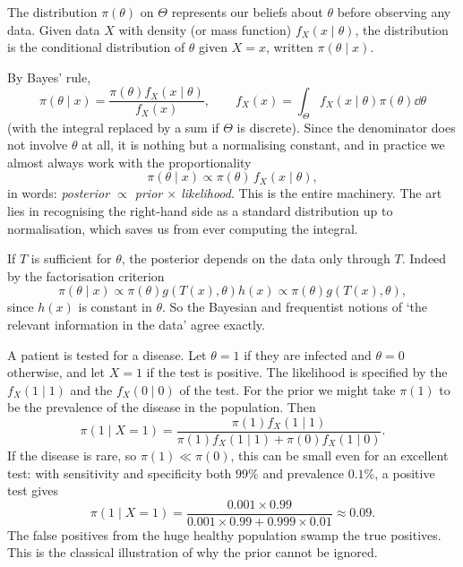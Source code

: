 \documentclass[a4paper]{scrartcl}
\begin{document}
\begin{definition}
  The  distribution $\pi(\theta)$ on $\Theta$ represents our beliefs about $\theta$ before observing any data. Given data $X$ with density (or mass function) $f_X(x \mid \theta)$, the  distribution is the conditional distribution of $\theta$ given $X = x$, written $\pi(\theta \mid x)$.
\end{definition}

By Bayes' rule,
$$
\pi(\theta \mid x) = \frac{\pi(\theta) f_X(x\mid\theta)}{f_X(x)}, \qquad f_X(x) = \int_\Theta f_X(x\mid\theta)\pi(\theta)\dd\theta
$$
(with the integral replaced by a sum if $\Theta$ is discrete). Since the denominator does not involve $\theta$ at all, it is nothing but a normalising constant, and in practice we almost always work with the proportionality
$$
\pi(\theta\mid x) \propto \pi(\theta)\, f_X(x\mid\theta),
$$
in words: \emph{posterior $\propto$ prior $\times$ likelihood}. This is the entire machinery. The art lies in recognising the right-hand side as a standard distribution up to normalisation, which saves us from ever computing the integral.

\begin{remark}
  If $T$ is sufficient for $\theta$, the posterior depends on the data only through $T$. Indeed by the factorisation criterion
  $$
  \pi(\theta \mid x) \propto \pi(\theta)g(T(x),\theta)h(x) \propto \pi(\theta)g(T(x),\theta),
  $$
  since $h(x)$ is constant in $\theta$. So the Bayesian and frequentist notions of `the relevant information in the data' agree exactly.
\end{remark}

\begin{example}
  A patient is tested for a disease. Let $\theta = 1$ if they are infected and $\theta = 0$ otherwise, and let $X = 1$ if the test is positive. The likelihood is specified by the  $f_X(1 \mid 1)$ and the  $f_X(0\mid 0)$ of the test. For the prior we might take $\pi(1)$ to be the prevalence of the disease in the population. Then
  $$
  \pi(1 \mid X = 1) = \frac{\pi(1)f_X(1\mid 1)}{\pi(1)f_X(1\mid 1) + \pi(0)f_X(1 \mid 0)}.
  $$
  If the disease is rare, so $\pi(1) \ll \pi(0)$, this can be small even for an excellent test: with sensitivity and specificity both $99\%$ and prevalence $0.1\%$, a positive test gives
  $$
  \pi(1\mid X=1) = \frac{0.001 \times 0.99}{0.001\times 0.99 + 0.999 \times 0.01} \approx 0.09.
  $$
  The false positives from the huge healthy population swamp the true positives. This is the classical illustration of why the prior cannot be ignored.
\end{example}
\end{document}
